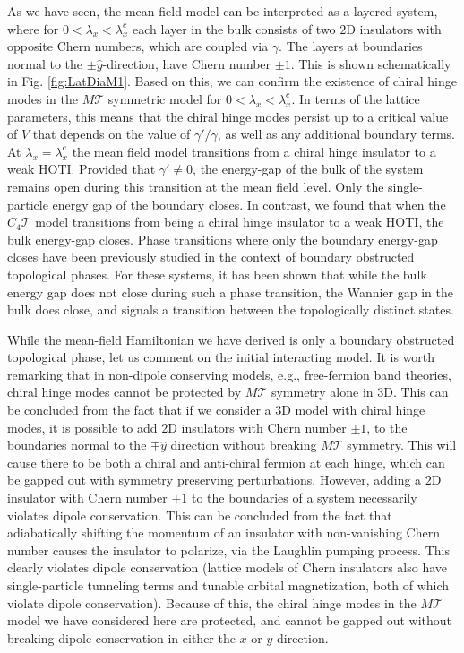 \documentclass[prb,aps,twocolumn,groupaddress,floatfix]{revtex4-1}
\begin{document}
As we have seen, the mean field model can be interpreted as a layered system, where for $0<\lambda_x < \lambda_x^c$ each layer in the bulk consists of two $2$D insulators with opposite Chern numbers, which are coupled via $\gamma$. The layers at boundaries normal to the $\pm \hat{y}$-direction, have Chern number $\pm 1$. This is shown schematically in Fig. \ref{fig:LatDiaM1}. Based on this, we can confirm the existence of chiral hinge modes in the $M \mathcal{T}$ symmetric model for $0<\lambda_x<\lambda_x^c$. In terms of the lattice parameters, this means that the chiral hinge modes persist up to a critical value of $V$ that depends on the value of $\gamma'/\gamma$, as well as any additional boundary terms. At $\lambda_x = \lambda_x^c$ the mean field model transitions from a chiral hinge insulator to a weak HOTI. Provided that $\gamma'\neq 0$, the energy-gap of the bulk of the system remains open during this transition at the mean field level. Only the single-particle energy gap of the boundary closes. In contrast, we found that when the $C_4\mathcal{T}$ model transitions from being a chiral hinge insulator to a weak HOTI, the bulk energy-gap closes. Phase transitions where only the boundary energy-gap closes have been previously studied in the context of boundary obstructed topological phases\cite{benalcazar2017a,khalaf2019boundary}. For these systems, it has been shown that while the bulk energy gap does not close during such a phase transition, the Wannier gap in the bulk does close, and signals a transition between the topologically distinct states. 

While the mean-field Hamiltonian we have derived is only a boundary obstructed topological phase, let us comment on the initial interacting model. It is worth remarking that in non-dipole conserving models, e.g., free-fermion band theories, chiral hinge modes cannot be protected by $M\mathcal{T}$ symmetry alone in $3$D. This can be concluded from the fact that if we consider a $3$D model with chiral hinge modes, it is possible to add $2$D insulators with Chern number $\pm 1$, to the boundaries normal to the $\mp \hat{y}$ direction without breaking $M\mathcal{T}$ symmetry. This will cause there to be both a chiral and anti-chiral fermion at each hinge, which can be gapped out with symmetry preserving perturbations. However, adding a $2$D insulator with Chern number $\pm 1$ to the boundaries of a system necessarily violates dipole conservation. This can be concluded from the fact that adiabatically shifting the momentum of an insulator with non-vanishing Chern number causes the insulator to polarize, via the Laughlin pumping process. This clearly violates dipole conservation (lattice models of Chern insulators also have single-particle tunneling terms and tunable orbital magnetization, both of which violate dipole conservation). Because of this, the chiral hinge modes in the $M\mathcal{T}$ model we have considered here are protected, and cannot be gapped out without breaking dipole conservation in either the $x$ or $y$-direction. 
\end{document}
